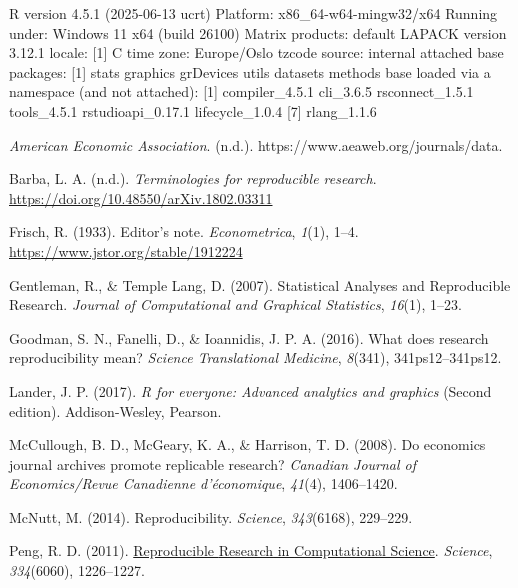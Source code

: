 \documentclass[
  british,
  a4paper,
]{article}
\newlength{\cslhangindent}
\newenvironment{CSLReferences}[2] %
 {\begin{list}{}{%
  \setlength{\itemindent}{0pt}
  \setlength{\leftmargin}{0pt}
  \setlength{\parsep}{0pt}
  \ifodd #1
   \setlength{\leftmargin}{\cslhangindent}
   \setlength{\itemindent}{-1\cslhangindent}
  \fi
  \setlength{\itemsep}{#2\baselineskip}}}
 {\end{list}}
\begin{document}
R version 4.5.1 (2025-06-13 ucrt) Platform: x86\_64-w64-mingw32/x64
Running under: Windows 11 x64 (build 26100) Matrix products: default
LAPACK version 3.12.1 locale: {[}1{]} C time zone: Europe/Oslo tzcode
source: internal attached base packages: {[}1{]} stats graphics
grDevices utils datasets methods base loaded via a namespace (and not
attached): {[}1{]} compiler\_4.5.1 cli\_3.6.5 rsconnect\_1.5.1
tools\_4.5.1 rstudioapi\_0.17.1 lifecycle\_1.0.4 {[}7{]} rlang\_1.1.6

\label{refs}
\begin{CSLReferences}{1}{0}
\emph{American {Economic Association}}. (n.d.).
https://www.aeaweb.org/journals/data.

Barba, L. A. (n.d.). \emph{Terminologies for reproducible research}.
\url{https://doi.org/10.48550/arXiv.1802.03311}

Frisch, R. (1933). Editor's note. \emph{Econometrica}, \emph{1}(1),
1--4. \url{https://www.jstor.org/stable/1912224}

Gentleman, R., \& Temple Lang, D. (2007). Statistical {Analyses} and
{Reproducible Research}. \emph{Journal of Computational and Graphical
Statistics}, \emph{16}(1), 1--23.

Goodman, S. N., Fanelli, D., \& Ioannidis, J. P. A. (2016). What does
research reproducibility mean? \emph{Science Translational Medicine},
\emph{8}(341), 341ps12--341ps12.

Lander, J. P. (2017). \emph{R for everyone: Advanced analytics and
graphics} (Second edition). Addison-Wesley, Pearson.

McCullough, B. D., McGeary, K. A., \& Harrison, T. D. (2008). Do
economics journal archives promote replicable research? \emph{Canadian
Journal of Economics/Revue Canadienne d'{é}conomique}, \emph{41}(4),
1406--1420.

McNutt, M. (2014). Reproducibility. \emph{Science}, \emph{343}(6168),
229--229.

Peng, R. D. (2011).
\href{https://www.ncbi.nlm.nih.gov/pubmed/22144613}{Reproducible
{Research} in {Computational Science}}. \emph{Science},
\emph{334}(6060), 1226--1227.


\end{CSLReferences}
\end{document}
